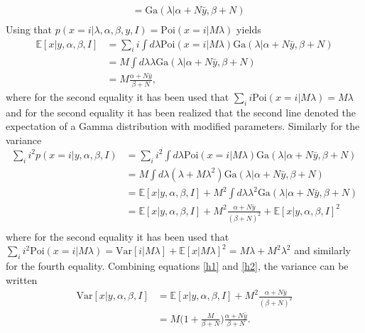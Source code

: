 \begin{example}
\begin{equation}
\begin{split}
			&= \text{Ga}(\lambda|\alpha+N\bar{y},\beta+N)\\
		\end{split}
	\end{equation}
	Using that $p(x =i|\lambda,\alpha,\beta,y,I) = \text{Poi}(x =i|M\lambda)$ yields
	\begin{equation}
		\begin{split}
			\mathbb{E}[x|y,\alpha,\beta,I] &= \sum_ii\int d\lambda \text{Poi}(x = i|M\lambda)\text{Ga}(\lambda| \alpha+N\bar{y},\beta +N)\\
			&= M\int d\lambda\lambda\text{Ga}(\lambda | \alpha+N\bar{y},\beta +N)\\
			&= M \frac{\alpha+N\bar{y}}{\beta +N},
		\end{split}
	\end{equation}
	where for the second equality it has been used that $\sum_ii \text{Poi}(x = i|M\lambda)=M\lambda$ and for the second equality it has been realized that the second line denoted the expectation of a Gamma distribution with modified parameters. Similarly for the variance
	\begin{equation}
		\begin{split}
			\sum_i i^2p(x = i|y,\alpha,\beta,I) &=  \sum_ii^2\int d\lambda \text{Poi}(x =i|M\lambda)\text{Ga}(\lambda | \alpha+N\bar{y},\beta +N)\\
			&=M\int d\lambda (\lambda +M\lambda^2)\text{Ga}(\lambda|\alpha+N\bar{y},\beta +N)\\
			&=\mathbb{E}[x|y,\alpha,\beta,I]+M^2\int d\lambda \lambda^2\text{Ga}(\lambda|\alpha+N\bar{y},\beta +N)\\
			&=\mathbb{E}[x|y,\alpha,\beta,I]+M^2\frac{\alpha+N\bar{y}}{(\beta +N)^2}+\mathbb{E}[x|y,\alpha,\beta,I]^2\\
		\end{split}
		\label{h2}
	\end{equation}
	where for the second equality it has been used that $\sum_ii^2\text{Poi}(x = i|M\lambda)=\text{Var}[i|M\lambda]+\mathbb{E}[x|M\lambda]^2=M\lambda +M^2\lambda^2$ and similarly for the fourth equality. Combining equations \eqref{h1} and \eqref{h2}, the variance can be written
	\begin{equation}
		\begin{split}
			\text{Var}[x|y,\alpha,\beta,I] & = \mathbb{E}[x|y,\alpha,\beta,I]+M^2\frac{\alpha+N\bar{y}}{(\beta +N)^2}\\
			& = M\bigg(1+\frac{M}{\beta+N}\bigg)\frac{\alpha+N\bar{y}}{\beta +N}.\\

\end{split}
\end{equation}
\end{example}
